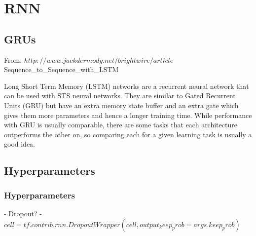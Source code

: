 \section{RNN} \label{sec:rnn}


\subsection{GRUs}
From: $http://www.jackdermody.net/brightwire/article$
Sequence_to_Sequence_with_LSTM

Long Short Term Memory (LSTM) networks are a recurrent neural network that can be used with STS neural networks. They are similar to Gated Recurrent Units (GRU) but have an extra memory state buffer and an extra gate which gives them more parameters and hence a longer training time. While performance with GRU is usually comparable, there are some tasks that each architecture outperforms the other on, so comparing each for a given learning task is usually a good idea.

\subsection{Hyperparameters}
\subsubsection{Hyperparameters}
- Dropout?
	- $cell = tf.contrib.rnn.DropoutWrapper(cell, output_keep_prob = args.keep_prob)$
